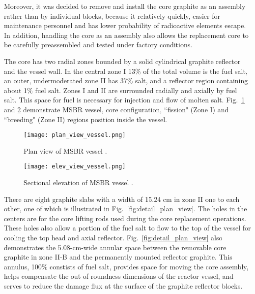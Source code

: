 Moreover, it was decided to remove and install the core graphite as an assembly rather than by individual blocks, because it relatively quickly, easier for maintenance personnel and has lower probability of radioactive elements escape. In addition, handling the core as an assembly also allows the replacement core to be carefully preassembled and tested under factory conditions.

The core has two radial zones bounded by a solid cylindrical graphite reflector 
and the vessel wall. In the central zone I 13\% of the total volume is the fuel salt, an outer, undermoderated zone II has 37\% salt, and a reflector region containing about 1\% fuel salt. Zones I and II are surrounded radially and axially by fuel salt. This space for fuel is necessary for injection and flow of molten 
salt. Fig.~\ref{fig:ref_plan_msbr} and \ref{fig:ref_sect_msbr} demonstrate \gls{MSBR} vessel, core configuration, ``fission" (Zone I) and ``breeding" (Zone II) regions position inside the vessel.

\begin{figure}[hbp!] %
  \centering
  \vspace{-0.3em}
  \texttt{[image: plan\_view\_vessel.png]}
  \caption{Plan view of \gls{MSBR} vessel \cite{robertson_conceptual_1971}.}
  \vspace{-0.6em}
  \label{fig:ref_plan_msbr}
\end{figure}
\FloatBarrier

\begin{figure}[hbp!] %
  \centering
  \vspace{-0.3em}
  \texttt{[image: elev\_view\_vessel.png]}
  \caption{Sectional elevation of \gls{MSBR} vessel \cite{robertson_conceptual_1971}.}
  \vspace{-0.6em}
  \label{fig:ref_sect_msbr}
\end{figure}
\FloatBarrier

There are eight graphite slabs with a width of 15.24 cm in zone II one to each other, one of which is illustrated in Fig.~\ref{fig:detail_plan_view}. The holes in the centers are for the core lifting rods used during the core replacement operations. These holes also allow a portion of the fuel salt to flow to the top of the vessel for cooling the top head and axial reflector. Fig.~\ref{fig:detail_plan_view} also demonstrates the 5.08-cm-wide annular space between the removable core graphite in zone II-B and the permanently mounted reflector graphite. This annulus, 100\% constists of fuel salt, provides space for moving the core assembly, helps compensate the out-of-roundness dimensions of the reactor vessel, and serves to reduce the damage flux at the surface of the graphite reflector blocks.

